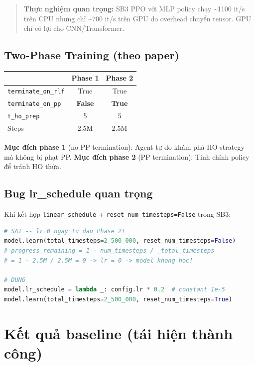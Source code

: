 \documentclass[11pt]{article}
\begin{document}
\begin{quote}
\textbf{Thực nghiệm quan trọng:} SB3 PPO với MLP policy chạy \textasciitilde 1100 it/s trên CPU nhưng chỉ \textasciitilde 700 it/s trên GPU do overhead chuyển tensor. GPU chỉ có lợi cho CNN/Transformer.
\end{quote}

\subsection{Two-Phase Training (theo paper)}

\begin{longtable}{@{}lcc@{}}
\toprule
 & \textbf{Phase 1} & \textbf{Phase 2} \\
\midrule
\endhead
\texttt{terminate\_on\_rlf} & True & True \\
\texttt{terminate\_on\_pp} & \textbf{False} & \textbf{True} \\
\texttt{t\_ho\_prep} & 5 & 5 \\
Steps & 2.5M & 2.5M \\
\bottomrule
\end{longtable}

\textbf{Mục đích phase 1} (no PP termination): Agent tự do khám phá HO strategy mà không bị phạt PP.
\textbf{Mục đích phase 2} (PP termination): Tinh chỉnh policy để tránh HO thừa.

\subsection{Bug lr\_schedule quan trọng}

Khi kết hợp \texttt{linear\_schedule} + \texttt{reset\_num\_timesteps=False} trong SB3:

\begin{lstlisting}[language=Python]
# SAI -- lr=0 ngay tu dau Phase 2!
model.learn(total_timesteps=2_500_000, reset_num_timesteps=False)
# progress_remaining = 1 - num_timesteps / _total_timesteps
# = 1 - 2.5M / 2.5M = 0 -> lr = 0 -> model khong hoc!

# DUNG
model.lr_schedule = lambda _: config.lr * 0.2  # constant 1e-5
model.learn(total_timesteps=2_500_000, reset_num_timesteps=True)
\end{lstlisting}

\section{Kết quả baseline (tái hiện thành công)}
\end{document}
